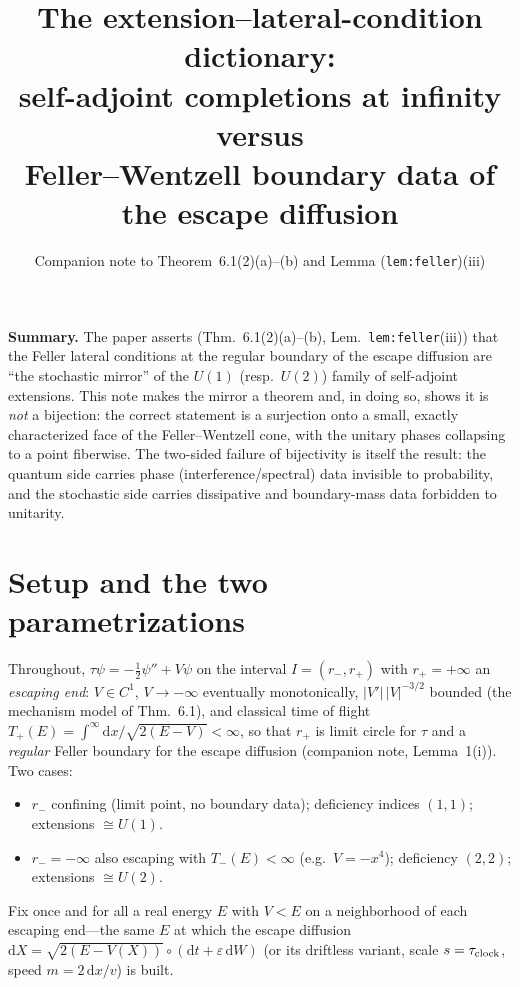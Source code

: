 \documentclass[11pt]{article}
\title{The extension--lateral-condition dictionary:\\
self-adjoint completions at infinity versus\\ Feller--Wentzell boundary
data of the escape diffusion}
\author{Companion note to Theorem~6.1(2)(a)--(b) and Lemma
(\texttt{lem:feller})(iii)}
\date{}
\theoremstyle{remark}
\newcommand{\dd}{\mathrm{d}}
\begin{document}
\maketitle

\noindent\textbf{Summary.}  The paper asserts (Thm.~6.1(2)(a)--(b),
Lem.~\texttt{lem:feller}(iii)) that the Feller lateral conditions at
the regular boundary of the escape diffusion are ``the stochastic
mirror'' of the $U(1)$ (resp.\ $U(2)$) family of self-adjoint
extensions.  This note makes the mirror a theorem and, in doing so,
shows it is \emph{not} a bijection: the correct statement is a
surjection onto a small, exactly characterized face of the
Feller--Wentzell cone, with the unitary phases collapsing to a point
fiberwise.  The two-sided failure of bijectivity is itself the result:
the quantum side carries phase (interference/spectral) data invisible
to probability, and the stochastic side carries dissipative and
boundary-mass data forbidden to unitarity.

\section{Setup and the two parametrizations}
\label{sec:setup}

Throughout, $\tau\psi=-\tfrac12\psi''+V\psi$ on the interval
$I=(r_-,r_+)$ with $r_+=+\infty$ an \emph{escaping end}: $V\in C^1$,
$V\to-\infty$ eventually monotonically, $|V'|\,|V|^{-3/2}$ bounded (the
mechanism model of Thm.~6.1), and classical time of flight
$T_+(E)=\int^{\infty}\dd x/\sqrt{2(E-V)}<\infty$, so that $r_+$ is
limit circle for $\tau$ \cite{ReedSimon2} and a \emph{regular} Feller
boundary for the escape diffusion (companion note, Lemma~1(i)).  Two
cases:
\begin{itemize}
\item[$n=1$:] $r_-$ confining (limit point, no boundary data);
deficiency indices $(1,1)$; extensions $\cong U(1)$.
\item[$n=2$:] $r_-=-\infty$ also escaping with $T_-(E)<\infty$
(e.g.\ $V=-x^4$); deficiency $(2,2)$; extensions $\cong U(2)$.
\end{itemize}
Fix once and for all a real energy $E$ with $V<E$ on a neighborhood of
each escaping end---the same $E$ at which the escape diffusion
$\dd X=\sqrt{2(E-V(X))}\circ(\dd t+\varepsilon\,\dd W)$ (or its
driftless variant, scale $s=\tau_{\rm clock}$, speed
$m=2\,\dd x/v$) is built.
\end{document}
